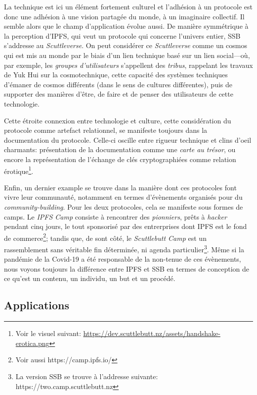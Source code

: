\documentclass{article}
\begin{document}
La technique est ici un élément fortement culturel et l'adhésion à un protocole est donc une adhésion à une vision partagée du monde, à un imaginaire collectif\cite{hall_representation_1997}. Il semble alors que le champ d'application évolue aussi. De manière symmétrique à la perception d'IPFS, qui veut un protocole qui concerne l'univers entier, SSB s'addresse au \emph{Scuttleverse}. On peut considérer ce \emph{Scuttleverse} comme un cosmos qui est mis au monde par le biais d'un lien technique basé sur un lien social—où, par exemple, les \emph{groupes d'utilisateurs} s'appellent des \emph{tribus}, rappelant les travaux de Yuk Hui sur la cosmotechnique, cette capacité des systèmes techniques d'émaner de cosmos différents (dans le sens de cultures différentes), puis de supporter des manières d'être, de faire et de penser des utilisateurs de cette technologie.

Cette étroite connexion entre technologie et culture, cette considération du protocole comme artefact relationnel, se manifeste toujours dans la documentation du protocole. Celle-ci oscille entre rigueur technique et clins d'oeil charmants: présentation de la documentation comme une \emph{carte au trésor}, ou encore la représentation de l'échange de clés cryptographiées comme relation érotique\footnote{Voir le visuel suivant: \url{https://dev.scuttlebutt.nz/assets/handshake-erotica.png}}.

Enfin, un dernier example se trouve dans la manière dont ces protocoles font vivre leur communauté, notamment en termes d'évènements organisés pour du \emph{community-building}. Pour les deux protocoles, cela se manifeste sous formes de camps. Le \emph{IPFS Camp} consiste à rencontrer des \emph{pionniers}, prêts à \emph{hacker} pendant cinq jours, le tout sponsorisé par des entrerprises dont IPFS est le fond de commerce\footnote{Voir aussi https://camp.ipfs.io/}; tandis que, de sont côté, le \emph{Scuttlebutt Camp} est un rassemblement sans véritable fin déterminée, ni agenda particulier\footnote{La version SSB se trouve à l'addresse suivante: https://two.camp.scuttlebutt.nz}. Même si la pandémie de la Covid-19 a été responsable de la non-tenue de ces évènements, nous voyons toujours la différence entre IPFS et SSB en termes de conception de ce qu'est un contenu, un individu, un but et un procédé.

\subsection{Applications}
\end{document}

